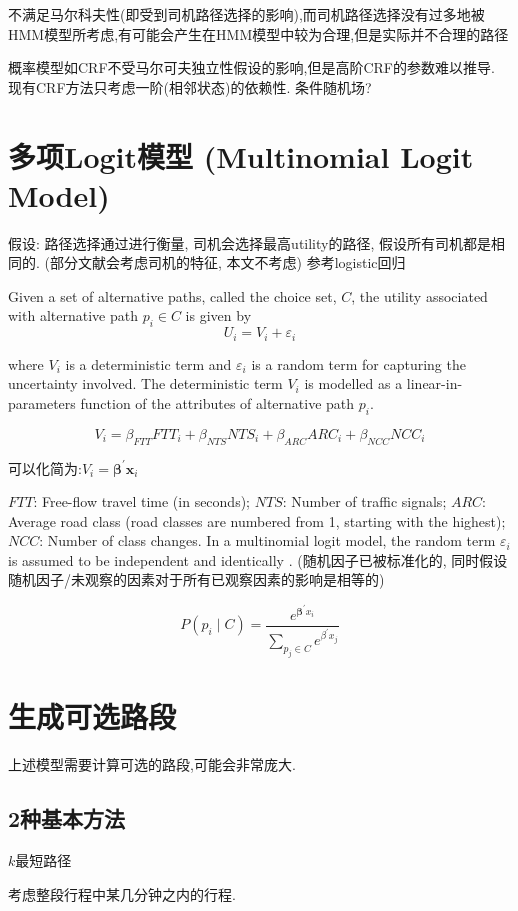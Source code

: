 不满足马尔科夫性(即受到司机路径选择的影响),而司机路径选择没有过多地被HMM模型所考虑,有可能会产生在HMM模型中较为合理,但是实际并不合理的路径

概率模型如CRF不受马尔可夫独立性假设的影响,但是高阶CRF的参数难以推导. 现有CRF方法只考虑一阶(相邻状态)的依赖性. 条件随机场?

\section{多项Logit模型 (Multinomial Logit Model)}

假设: 路径选择通过进行衡量, 司机会选择最高utility的路径, 假设所有司机都是相同的. (部分文献会考虑司机的特征, 本文不考虑) 参考logistic回归

Given a set of alternative paths, called the choice set, $ C $, the utility associated with alternative path $ p_{i} \in C $ is given by
$$
U_{i}=V_{i}+\varepsilon_{i}
$$

where $ V_{i} $ is a deterministic term and $ \varepsilon_{i} $ is a random term for capturing the uncertainty involved. The deterministic term $ V_{i} $ is modelled as a linear-in-parameters function of the attributes of alternative path $ p_{i} $. 

$$ V_{i}=\beta_{F T T} F T T_{i}+\beta_{N T S} N T S_{i}+\beta_{A R C} A R C_{i}+\beta_{N C C} N C C_{i} $$

可以化简为:$ V_{i}=\boldsymbol{\beta}^{\prime} \boldsymbol{x}_{i} $

$FTT$: Free-flow travel time (in seconds); $N T S$: Number of traffic signals; $ARC$: Average road class (road classes are numbered from 1, starting with the highest);$NCC$: Number of class changes. In a multinomial logit model, the random term $ \varepsilon_{i} $ is assumed to be independent and identically . (随机因子已被标准化的, 同时假设随机因子/未观察的因素对于所有已观察因素的影响是相等的)

$$ P\left(p_{i} \mid C\right)=\frac{e^{\boldsymbol{\beta}^{\prime} x_{i}}}{\sum_{p_{j} \in C} e^{\beta^{\prime} x_{j}}} $$

\section{生成可选路段}

上述模型需要计算可选的路段,可能会非常庞大.

\subsection{2种基本方法}

$k$最短路径

\begin{remark}
    
\end{remark}

考虑整段行程中某几分钟之内的行程. 